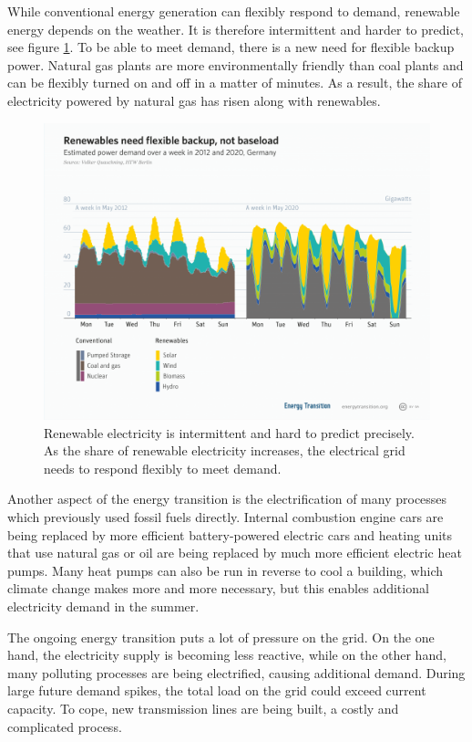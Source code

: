 While conventional energy generation can flexibly respond to demand, renewable energy depends on the weather.
It is therefore intermittent and harder to predict, see figure \ref{fig:flexibility}. To be able to meet demand, there is a new need for flexible backup power.
Natural gas plants are more environmentally friendly than coal plants and can be flexibly turned on and off in a matter of minutes.
As a result, the share of electricity powered by natural gas has risen along with renewables.

\begin{figure}
    \centering
    \includegraphics[width = \figurewidth]{figures/flexible_renewables.png}
    \caption{Renewable electricity is intermittent and hard to predict precisely. As the share of renewable electricity increases, the electrical grid needs to respond flexibly to meet demand.}
    \label{fig:flexibility}
\end{figure}


Another aspect of the energy transition is the electrification of many processes which previously used fossil fuels directly.
Internal combustion engine cars are being replaced by more efficient battery-powered electric cars and heating units that use natural gas or oil are being replaced by much more efficient electric heat pumps.
Many heat pumps can also be run in reverse to cool a building, which climate change makes more and more necessary, but this enables additional electricity demand in the summer.

The ongoing energy transition puts a lot of pressure on the grid.
On the one hand, the electricity supply is becoming less reactive, while on the other hand, many polluting processes are being electrified, causing additional demand.
During large future demand spikes, the total load on the grid could exceed current capacity. To cope, new transmission lines are being built, a costly and complicated process.

